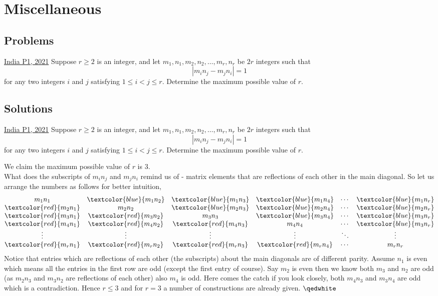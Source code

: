 \section{Miscellaneous}
\subsection{Problems}
\begin{problem}{1}{\href{}{India P1, 2021}}
	Suppose $r \ge 2$ is an integer, and let $m_1, n_1, m_2, n_2, \dots, m_r, n_r$ be $2r$ integers such that$$\left|m_in_j-m_jn_i\right|=1$$for any two integers $i$ and $j$ satisfying $1 \le i<j \le r$. Determine the maximum possible value of $r$.
\end{problem}


\subsection{Solutions}
\begin{problem}{1}{\href{}{India P1, 2021}}
	Suppose $r \ge 2$ is an integer, and let $m_1, n_1, m_2, n_2, \dots, m_r, n_r$ be $2r$ integers such that$$\left|m_in_j-m_jn_i\right|=1$$for any two integers $i$ and $j$ satisfying $1 \le i<j \le r$. Determine the maximum possible value of $r$.
	\begin{solution} We claim the maximum possible value of $r$ is $3$.\\
What does the subscripts of $m_in_j$ and $m_jn_i$ remind us of - matrix elements that are reflections of each other in the main diagonal. So let us arrange the numbers as follows for better intuition,
$$\begin{matrix}
		m_1n_1 & \textcolor{blue}{m_1n_2} & \textcolor{blue}{m_1n_3} & \textcolor{blue}{m_1n_4} & \cdots & \textcolor{blue}{m_1n_r}\\
		\textcolor{red}{m_2n_1} & m_2n_2 & \textcolor{blue}{m_2n_3} & \textcolor{blue}{m_2n_4} & \cdots & \textcolor{blue}{m_2n_r}\\
		\textcolor{red}{m_3n_1} & \textcolor{red}{m_3n_2} & m_3n_3 & \textcolor{blue}{m_3n_4} & \cdots & \textcolor{blue}{m_3n_r}\\
		\textcolor{red}{m_4n_1} & \textcolor{red}{m_4n_2} & \textcolor{red}{m_4n_3} & m_4n_4 & \cdots & \textcolor{blue}{m_3n_r}\\
		\vdots & \vdots & \vdots & \vdots & \ddots & \vdots\\
		\textcolor{red}{m_rn_1} & \textcolor{red}{m_rn_2} & \textcolor{red}{m_rn_3} & \textcolor{red}{m_rn_4} & \cdots & m_rn_r
	\end{matrix}
	$$
		\indent Notice that entries which are reflections of each other (the subscripts) about the main diagonals are of different parity. Assume $n_1$ is even which means all the entries in the first row are odd (except the first entry of course). Say $m_2$ is even then we know both $m_3$ and $n_2$ are odd (as $m_2n_3$ and $m_3n_2$ are reflections of each other) also $m_4$ is odd. Here comes the catch if you look closely, both $m_4n_3$ and $m_3n_4$ are odd which is a contradiction. Hence $r\le 3$ and for $r=3$ a number of constructions are already given. $\qedwhite$
	\end{solution}
	
\end{problem}

